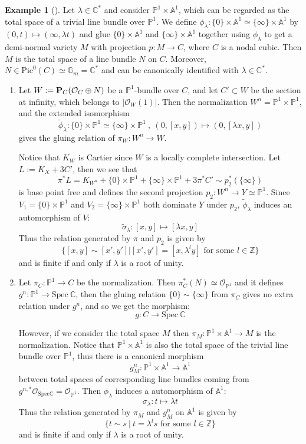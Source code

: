 \documentclass[11pt]{amsart}
\numberwithin{equation}{section}
\newcommand{\PP}{{\bf{P}}}
\newcommand{\Spec}{\mathrm{Spec}}
\newcommand{\Cc}{\mathbb{C}}
\newcommand{\Pp}{\mathbb{P}}
\newcommand{\Zz}{\mathbb{Z}}
\newcommand{\Oo}{\mathcal{O}}
\newcommand{\Pic}{\mathrm{Pic}}
\theoremstyle{definition}
\theoremstyle{definition}
\newtheorem{ex}[thm]{Example}
\theoremstyle{definition}
\begin{document}
\begin{ex}[{\cite[Example 4.15]{LX22b}}]\label{ex: relation is not finite in general}
Let $\lambda\in\Cc^*$ and consider $\Pp^1\times \mathbb{A}^1$, which can be regarded as the total space of a trivial line bundle over $\Pp^1$. We define $\phi_\lambda: \{0\}\times\mathbb{A}^1\simeq\{\infty\}\times\mathbb{A}^1$ by $(0,t)\mapsto(\infty,\lambda t)$ and glue $\{0\}\times\mathbb{A}^1$ and $\{\infty\}\times\mathbb{A}^1$ together using $\phi_\lambda$ to get a demi-normal variety $M$ with projection $p:M\to C$, where $C$ is a nodal cubic. Then $M$ is the total space of a line bundle $N$ on $C$. Moreover, $N\in\Pic^0(C)\simeq\mathbb{G}_m=\Cc^*$ and can be canonically identified with $\lambda\in\Cc^*$. 

\begin{enumerate}
    \item Let $W:=\PP_C(\Oo_C\oplus N)$ be a $\Pp^1$-bundle over $C$, and let $C'\subset W$ be the section at infinity, which belongs to $|\Oo_W(1)|$. Then the normalization $W^n=\Pp^1\times\Pp^1$, and the extended isomorphism
    $$
    \tilde{\phi}_\lambda: \{0\}\times\Pp^1\simeq\{\infty\}\times\Pp^1~,~(0,[x,y])\mapsto(0,[\lambda x,y])
    $$
    gives the gluing relation of $\pi_W: W^n\to W$.
    
    Notice that $K_W$ is Cartier since $W$ is a locally complete intersection. Let $L:=K_X+3C'$, then we see that 
    $$
    \pi^*L=K_{W^n}+\{0\}\times\Pp^1+\{\infty\}\times\Pp^1+3\pi^*C'\sim p_2^*(\{\infty\})
    $$ is base point free and defines the second projection $p_2:W^n\to Y\simeq \Pp^1$. Since $V_1=\{0\}\times\Pp^1$ and $V_2=\{\infty\}\times\Pp^1$ both dominate $Y$ under $p_2$, $\tilde{\phi}_\lambda$ induces an automorphism of $V$:
    $$
    \tilde{\sigma}_\lambda:[x,y]\mapsto[\lambda x,y]
    $$
    Thus the relation generated by $\pi$ and $p_2$ is given by
$$\{[x,y]\sim[x',y']|[x',y']=[x,\lambda^ly] \text{ for some $l\in\Zz$}\}$$
and is finite if and only if $\lambda$ is a root of unity.
\item Let $\pi_C:\Pp^1\to C$ be the normalization. Then $\pi_C^*(N)\simeq\Oo_{\Pp^1}$ and it defines $g^n:\Pp^1\to\Spec~\Cc$, then the gluing relation $\{0\}\sim\{\infty\}$ from $\pi_C$ gives no extra relation under $g^n$, and so we get the morphism: $$
g: C\to\Spec~\Cc
$$ 

However, if we consider the total space $M$ then $\pi_M:\Pp^1\times\mathbb{A}^1\to M$ is the normalization. Notice that $\Pp^1\times\mathbb{A}^1$ is also the total space of the trivial line bundle over $\Pp^1$, thus there is a canonical morphism 
$$
g^n_M: \Pp^1\times\mathbb{A}^1\to \mathbb{A}^1
$$
between total spaces of corresponding line bundles coming from $g^{n,*}\Oo_{\Spec\Cc}=\Oo_{\Pp^1}$. Then $\phi_\lambda$ induces a automorphism of $\mathbb{A}^1$:
$$
\sigma_\lambda: t\mapsto\lambda t   
$$
Thus the relation generated by $\pi_M$ and $g^n_M$ on $\mathbb{A}^1$ is given by 
$$
\{t\sim s ~|~t=\lambda^l s \text{ for some $l\in\Zz$}\}
$$
and is finite if and only if $\lambda$ is a root of unity. 


\end{enumerate}
\end{ex}
\end{document}
